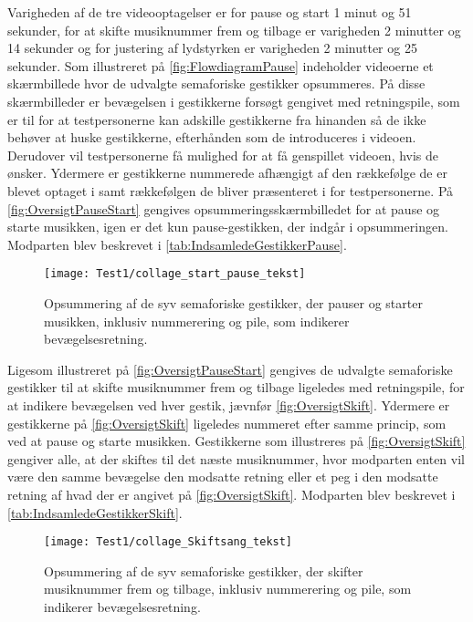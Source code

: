 Varigheden af de tre videooptagelser er for pause og start 1 minut og 51 sekunder, for at skifte musiknummer frem og tilbage er varigheden 2 minutter og 14 sekunder og for justering af lydstyrken er varigheden 2 minutter og 25 sekunder.\blankline
%
Som illustreret på \autoref{fig:FlowdiagramPause} indeholder videoerne et skærmbillede hvor de udvalgte semaforiske gestikker opsummeres. På disse skærmbilleder er bevægelsen i gestikkerne forsøgt gengivet med retningspile, som er til for at testpersonerne kan adskille gestikkerne fra hinanden så de ikke behøver at huske gestikkerne, efterhånden som de introduceres i videoen. Derudover vil testpersonerne få mulighed for at få genspillet videoen, hvis de ønsker. Ydermere er gestikkerne nummerede afhængigt af den rækkefølge de er blevet optaget i samt rækkefølgen de bliver præsenteret i for testpersonerne. På \autoref{fig:OversigtPauseStart} gengives opsummeringsskærmbilledet for at pause og starte musikken, igen er det kun pause-gestikken, der indgår i opsummeringen. Modparten blev beskrevet i \autoref{tab:IndsamledeGestikkerPause}.  
% 
\begin{figure}[H]
	\centering
	\texttt{[image: Test1/collage\_start\_pause\_tekst]}
	\caption{Opsummering af de syv semaforiske gestikker, der pauser og starter musikken, inklusiv nummerering og pile, som indikerer bevægelsesretning.}
	\label{fig:OversigtPauseStart}
\end{figure}
\noindent
%
Ligesom illustreret på \autoref{fig:OversigtPauseStart} gengives de udvalgte semaforiske gestikker til at skifte musiknummer frem og tilbage ligeledes med retningspile, for at indikere bevægelsen ved hver gestik, jævnfør \autoref{fig:OversigtSkift}. Ydermere er gestikkerne på \autoref{fig:OversigtSkift} ligeledes nummeret efter samme princip, som ved at pause og starte musikken. Gestikkerne som illustreres på \autoref{fig:OversigtSkift} gengiver alle, at der skiftes til det næste musiknummer, hvor modparten enten vil være den samme bevægelse den modsatte retning eller et peg i den modsatte retning af hvad der er angivet på \autoref{fig:OversigtSkift}. Modparten blev beskrevet i \autoref{tab:IndsamledeGestikkerSkift}.
%
\begin{figure}[H]
	\centering
	\texttt{[image: Test1/collage\_Skiftsang\_tekst]}
	\caption{Opsummering af de syv semaforiske gestikker, der skifter musiknummer frem og tilbage, inklusiv nummerering og pile, som indikerer bevægelsesretning.}
	\label{fig:OversigtSkift}
\end{figure}
